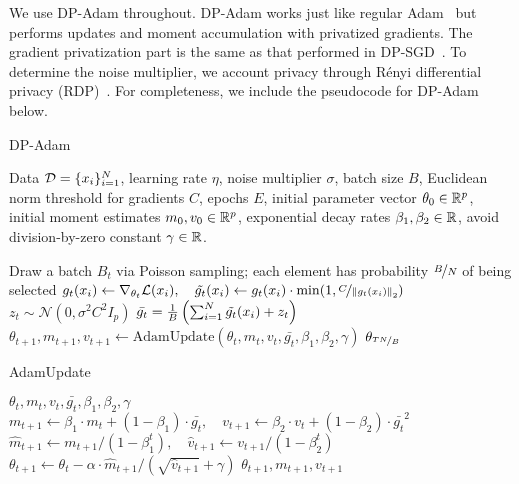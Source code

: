 We use DP-Adam throughout. DP-Adam works just like regular Adam~\citep{kingma2014adam} but performs updates and moment accumulation with privatized gradients. 
The gradient privatization part is the same as that performed in DP-SGD~\citep{song2013stochastic,abadi2016deep}.
To determine the noise multiplier, we account privacy through R\'enyi differential privacy (RDP)~\citep{mironov2017renyi,mironov2019r}.
For completeness, we include the pseudocode for DP-Adam below. 

\vspace{-2mm}
\begin{algorithm}[H]\label{algo:dp_adam}
\centering
\caption{DP-Adam}
\begin{algorithmic}[1]
  Data $\mathcal{D}=\{x_i\}_{i=1}^N$, learning rate $\eta$, noise multiplier $\sigma$, batch size $B$, Euclidean norm threshold for gradients $C$, epochs $E$, initial parameter vector $\theta_0\in\mathbb{R}^p$, initial moment estimates $m_0, v_0 \in \mathbb{R}^p$,
  exponential decay rates $\beta_1, \beta_2 \in \mathbb{R}$,
  avoid division-by-zero constant $\gamma\in \mathbb{R}$.


    \State Draw a batch $B_t$ via Poisson sampling; each element has probability $\nicefrac{B}{N}$ of being selected
        \State
        $
        g_t(x_i) \gets \nabla_{\theta_t} \mathcal{L}(x_i), \quad
        \tilde{g_t}(x_i) \gets g_t(x_i) \cdot \min(1, \nicefrac{C}{ \left\lVert g_t(x_i)\right\rVert_2 })
        $
    \EndFor
    \State $z_t \sim \mathcal{N}(0, \sigma^2 C^2 I_p)$
    \State $\bar{g_t} = \frac{1}{B} \left( 
        \sum_{i=1}^N \tilde{g_t}(x_i) + z_t
    \right)$
    \State $\theta_{t + 1}, m_{t+1}, v_{t+1} \gets \text{AdamUpdate}(\theta_t, m_{t}, v_{t}, \bar{g_t}, \beta_1, \beta_2, \gamma)$
    \EndFor
\State \Return $\theta_{\nicefrac{TN}{B}}$
\end{algorithmic}
\end{algorithm}

\vspace{-6mm}
\begin{algorithm}[H]\label{algo:adam_update}
\centering
\caption{AdamUpdate}
\begin{algorithmic}[1]
  $\theta_t, m_t, v_t, \bar{g_t}, \beta_1, \beta_2, \gamma$ 
  \State
  $
  m_{t+1} \leftarrow
    \beta_{1} \cdot m_{t} + \left(1-\beta_{1}\right) \cdot \bar{g_t}, \quad 
  v_{t+1} \leftarrow
    \beta_{2} \cdot v_{t}+\left(1-\beta_{2}\right) \cdot \bar{g_t}^{2}
  $
  \State
  $
  \widehat{m}_{t+1} \leftarrow m_{t+1} /\left(1-\beta_{1}^{t}\right), \quad
  \widehat{v}_{t+1} \leftarrow v_{t+1} /\left(1-\beta_{2}^{t}\right)
  $
  \State
  $
  \theta_{t+1} \leftarrow \theta_{t}-\alpha \cdot \widehat{m}_{t+1} /\left(\sqrt{\widehat{v}_{t+1}}+\gamma\right)
  $
  \State  \Return $\theta_{t+1}, m_{t +1}, v_{t + 1}$
\end{algorithmic}
\end{algorithm}


